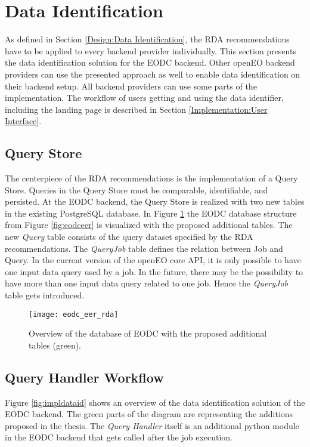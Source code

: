 \documentclass[draft,final]{vutinfth} %
\begin{document}
\section{Data Identification}\label{Implementation:Data Identification}

As defined in Section \ref{Design:Data Identification}, the RDA recommendations have to be applied to every backend provider individually. This section presents the data identification solution for the EODC backend. Other openEO backend providers can use the presented approach as well to enable data identification on their backend setup. All backend providers can use some parts of the implementation. The workflow of users getting and using the data identifier, including the landing page is described in Section \ref{Implementation:User Interface}. \\

\subsection{Query Store}
The centerpiece of the RDA recommendations is the implementation of a Query Store. Queries in the Query Store must be comparable, identifiable, and persisted. At the EODC backend, the Query Store is realized with two new tables in the existing PostgreSQL database. In Figure \ref{fig:eer_rda} the EODC database structure from Figure \ref{fig:eodceer} is visualized with the proposed additional tables. The new \textit{Query} table consists of the query dataset specified by the RDA recommendations. The \textit{QueryJob} table defines the relation between Job and Query. In the current version of the openEO core API, it is only possible to have one input data query used by a job. In the future, there may be the possibility to have more than one input data query related to one job. Hence the \textit{QueryJob} table gets introduced. 

\begin{figure}[h]
	\centering
	\texttt{[image: eodc\_eer\_rda]}
	\caption{Overview of the database of EODC with the proposed additional tables (green).}
	\label{fig:eer_rda} %
\end{figure}

\subsection{Query Handler Workflow}
Figure \ref{fig:impldataid} shows an overview of the data identification solution of the EODC backend. The green parts of the diagram are representing the additions proposed in the thesis. The \textit{Query Handler} itself is an additional python module in the EODC backend that gets called after the job execution. 
\end{document}
